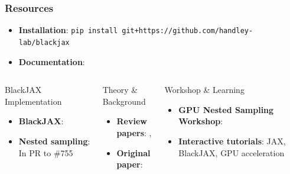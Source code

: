 \documentclass[aspectratio=169]{beamer}
\begin{document}
\begin{frame}
    \frametitle{Resources}
    \begin{itemize}
        \item \textbf{Installation}: \texttt{pip install git+https://github.com/handley-lab/blackjax}
        \item \textbf{Documentation}: 
    \end{itemize}
    \begin{columns}
        \begin{block}{BlackJAX Implementation}
            \begin{itemize}
                \item \textbf{BlackJAX}: 
                \item \textbf{Nested sampling}: In PR to  \#755
            \end{itemize}
        \end{block}
        \begin{block}{Theory \& Background}
            \begin{itemize}
                \item \textbf{Review papers}: , 
                \item \textbf{Original paper}: 
            \end{itemize}
        \end{block}
        \begin{block}{Workshop \& Learning}
            \begin{itemize}
                \item \textbf{GPU Nested Sampling Workshop}: 
                \item \textbf{Interactive tutorials}: JAX, BlackJAX, GPU acceleration
            \end{itemize}
        \end{block}
    \end{columns}
\end{frame}
\end{document}
